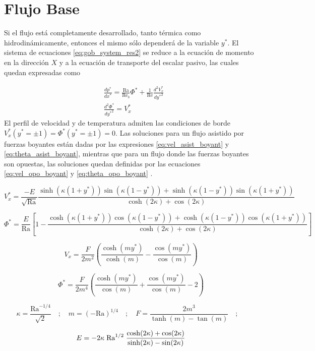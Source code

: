 \section{Flujo Base}

Si el flujo está completamente desarrollado, tanto térmica como hidrodinámicamente, entonces el mismo sólo dependerá de la variable $y^*$. El sistema de ecuaciones \ref{eq:gob_system_res2} se reduce a la ecuación de momento en la dirección $X$ y a la ecuación de transporte del escalar pasivo, las cuales quedan expresadas como 

\begin{align}
&\frac{d p^* }{d x^*} = \frac{\text{Ra}}{\text{Re}_b } \Phi^* + \frac{1}{\text{Re}} \frac{d^2 V^*_x}{d {y^*}^2} \\
&\frac{d^2 \Phi^*}{ d {y^*}^2 } =  V^*_x
\label{eq:base1}
\end{align}
El perfil de velocidad y de temperatura admiten las condiciones de borde $V^*_x({y^*}= \pm 1) = \Phi^* ({y^*}= \pm 1) = 0 $. Las soluciones para un flujo asistido por fuerzas boyantes están dadas por las expresiones \ref{eq:vel_asist_boyant} y \ref{eq:theta_asist_boyant}, mientras que para un flujo donde las fuerzas boyantes son opuestas, las soluciones quedan definidas por las ecuaciones \ref{eq:vel_opo_boyant} y \ref{eq:theta_opo_boyant} \cite{chen1996linear}. 
\small{
\begin{equation}
V^*_x = \frac{-E}{\sqrt{\text{Ra}}} \frac{\sinh(\kappa(1+y^*))\sin(\kappa(1-y^*)) + \sinh(\kappa(1-y^*))\sin(\kappa(1+y^*)) }{\cosh(2\kappa) + \cos(2\kappa)}
\label{eq:vel_asist_boyant}
\end{equation}

\begin{equation}
\Phi^* = \frac{E}{\text{Ra}} \left[ 1 - \frac{\cosh(\kappa(1+y^*))\cos(\kappa(1-y^*)) + \cosh(\kappa(1-y^*))\cos(\kappa(1+y^*))}{\cosh(2\kappa) + \cos(2\kappa)} \right] 
\label{eq:theta_asist_boyant}
\end{equation}


\begin{equation}
V_x = \frac{F}{2 m^2} \left( \frac{\cosh(m y^*)}{\cosh(m)} - \frac{\cos(m y^*)}{\cos(m)} \right) 
\label{eq:vel_opo_boyant}
\end{equation}

\begin{equation}
\Phi^* = \frac{F}{2 m^4} \left( \frac{\cosh(m y^*)}{\cos(m)} + \frac{\cos(m y^*)}{\cos(m)} - 2 \right) 
\label{eq:theta_opo_boyant}
\end{equation}

\begin{equation*}
\kappa = \frac{\text{Ra}^{-1/4}}{\sqrt{2}} \quad ; \quad m = (-\text{Ra})^{1/4} \quad ; \quad F = \frac{2 m^3}{\tanh(m)-\tan(m)} \quad ; \quad
\end{equation*}

\begin{equation*}
E= -2 \kappa \hspace{1mm} \text{Ra}^{1/2} \hspace{1mm} \frac{\cosh(2\kappa) + \cos(2\kappa)}{\sinh(2\kappa) - \sin(2\kappa)} 
\end{equation*}
}
